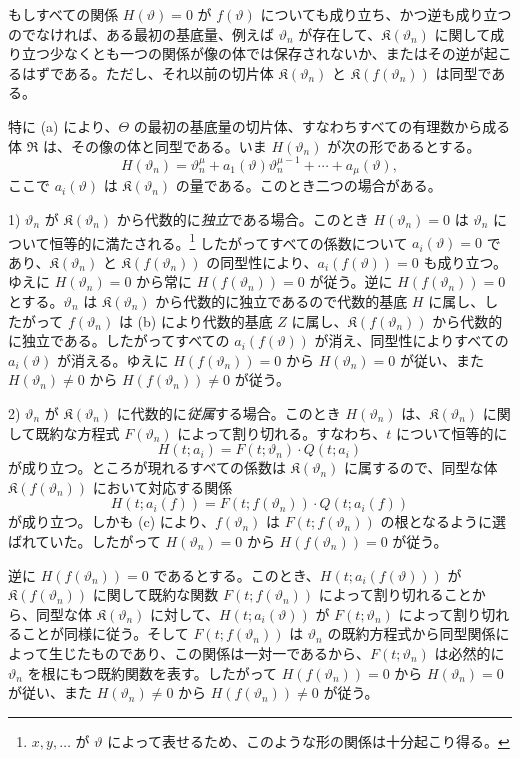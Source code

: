 \documentclass[11pt]{article}
\begin{document}
もしすべての関係 $H(\vartheta)=0$ が $f(\vartheta)$ についても成り立ち、かつ逆も成り立つのでなければ、ある最初の基底量、例えば $\vartheta_n$ が存在して、$\mathfrak K(\vartheta_n)$ に関して成り立つ少なくとも一つの関係が像の体では保存されないか、またはその逆が起こるはずである。ただし、それ以前の切片体 $\mathfrak K(\vartheta_n)$ と $\mathfrak K(f(\vartheta_n))$ は同型である。

特に (a) により、$\Theta$ の最初の基底量の切片体、すなわちすべての有理数から成る体 $\mathfrak R$ は、その像の体と同型である。いま $H(\vartheta_n)$ が次の形であるとする。
\[
H(\vartheta_n)=\vartheta_n^{\mu}+a_1(\vartheta)\vartheta_n^{\mu-1}+\cdots+a_\mu(\vartheta),
\]
ここで $a_i(\vartheta)$ は $\mathfrak K(\vartheta_n)$ の量である。このとき二つの場合がある。

1) $\vartheta_n$ が $\mathfrak K(\vartheta_n)$ から代数的に\emph{独立}である場合。このとき $H(\vartheta_n)=0$ は $\vartheta_n$ について恒等的に満たされる。\footnote{$x,y,\ldots$ が $\vartheta$ によって表せるため、このような形の関係は十分起こり得る。} したがってすべての係数について $a_i(\vartheta)=0$ であり、$\mathfrak K(\vartheta_n)$ と $\mathfrak K(f(\vartheta_n))$ の同型性により、$a_i(f(\vartheta))=0$ も成り立つ。ゆえに $H(\vartheta_n)=0$ から常に $H(f(\vartheta_n))=0$ が従う。逆に $H(f(\vartheta_n))=0$ とする。$\vartheta_n$ は $\mathfrak K(\vartheta_n)$ から代数的に独立であるので代数的基底 $H$ に属し、したがって $f(\vartheta_n)$ は (b) により代数的基底 $Z$ に属し、$\mathfrak K(f(\vartheta_n))$ から代数的に独立である。したがってすべての $a_i(f(\vartheta))$ が消え、同型性によりすべての $a_i(\vartheta)$ が消える。ゆえに $H(f(\vartheta_n))=0$ から $H(\vartheta_n)=0$ が従い、また $H(\vartheta_n)\ne0$ から $H(f(\vartheta_n))\ne0$ が従う。

2) $\vartheta_n$ が $\mathfrak K(\vartheta_n)$ に代数的に\emph{従属}する場合。このとき $H(\vartheta_n)$ は、$\mathfrak K(\vartheta_n)$ に関して既約な方程式 $F(\vartheta_n)$ によって割り切れる。すなわち、$t$ について恒等的に
\[
H(t;a_i)=F(t;\vartheta_n)\cdot Q(t;a_i)
\]
が成り立つ。ところが現れるすべての係数は $\mathfrak K(\vartheta_n)$ に属するので、同型な体 $\mathfrak K(f(\vartheta_n))$ において対応する関係
\[
H(t;a_i(f))=F(t;f(\vartheta_n))\cdot Q(t;a_i(f))
\]
が成り立つ。しかも (c) により、$f(\vartheta_n)$ は $F(t;f(\vartheta_n))$ の根となるように選ばれていた。したがって $H(\vartheta_n)=0$ から $H(f(\vartheta_n))=0$ が従う。

逆に $H(f(\vartheta_n))=0$ であるとする。このとき、$H(t;a_i(f(\vartheta)))$ が $\mathfrak K(f(\vartheta_n))$ に関して既約な関数 $F(t;f(\vartheta_n))$ によって割り切れることから、同型な体 $\mathfrak K(\vartheta_n)$ に対して、$H(t;a_i(\vartheta))$ が $F(t;\vartheta_n)$ によって割り切れることが同様に従う。そして $F(t;f(\vartheta_n))$ は $\vartheta_n$ の既約方程式から同型関係によって生じたものであり、この関係は一対一であるから、$F(t;\vartheta_n)$ は必然的に $\vartheta_n$ を根にもつ既約関数を表す。したがって $H(f(\vartheta_n))=0$ から $H(\vartheta_n)=0$ が従い、また $H(\vartheta_n)\ne0$ から $H(f(\vartheta_n))\ne0$ が従う。
\end{document}
